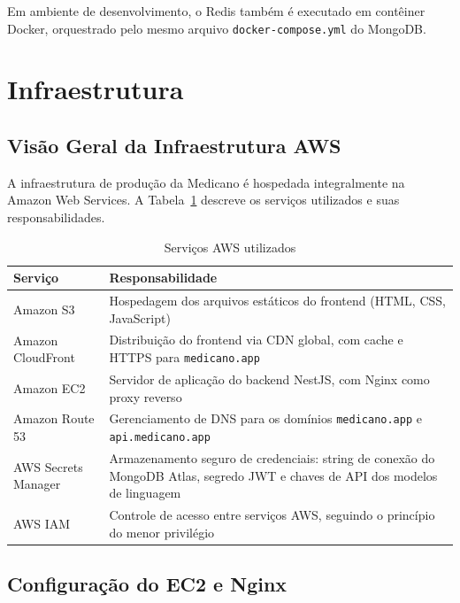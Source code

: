 Em ambiente de desenvolvimento, o Redis também
é executado em contêiner Docker, orquestrado
pelo mesmo arquivo \texttt{docker-compose.yml}
do MongoDB.

\section{Infraestrutura}
\label{sec:infrastructure}

\subsection{Visão Geral da Infraestrutura AWS}
\label{subsec:aws-overview}

A infraestrutura de produção da Medicano é
hospedada integralmente na Amazon Web Services.
A Tabela~\ref{tab:aws-services} descreve os
serviços utilizados e suas responsabilidades.

\begin{table}[H]
  \centering
  \caption{Serviços AWS utilizados}
  \label{tab:aws-services}
  \begin{tabular}{p{3.5cm}p{7.5cm}}
    \toprule
    \textbf{Serviço} &
    \textbf{Responsabilidade} \\
    \midrule
    Amazon S3
      & Hospedagem dos arquivos estáticos do
        frontend (HTML, CSS, JavaScript) \\
    Amazon CloudFront
      & Distribuição do frontend via CDN global,
        com cache e HTTPS para \texttt{medicano.app} \\
    Amazon EC2
      & Servidor de aplicação do backend NestJS,
        com Nginx como proxy reverso \\
    Amazon Route 53
      & Gerenciamento de DNS para os domínios
        \texttt{medicano.app} e
        \texttt{api.medicano.app} \\
    AWS Secrets Manager
      & Armazenamento seguro de credenciais:
        string de conexão do MongoDB Atlas,
        segredo JWT e chaves de API dos
        modelos de linguagem \\
    AWS IAM
      & Controle de acesso entre serviços AWS,
        seguindo o princípio do menor privilégio \\
    \bottomrule
  \end{tabular}
\end{table}

\subsection{Configuração do EC2 e Nginx}
\label{subsec:ec2-nginx}

